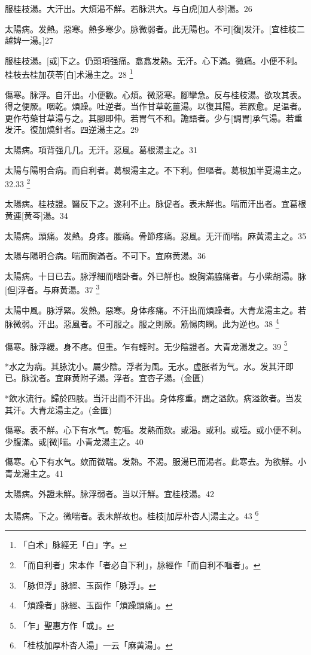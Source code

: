 \documentclass[12pt,oneside,UTF8,b5paper]{ctexbook}她她她她她她她
\begin{document}
服桂枝湯。大汗出。大煩渴不觧。若脉洪大。与白虎[加人参]湯。26

太陽病。发熱。惡寒。熱多寒少。脉微弱者。此无陽也。不可[復]发汗。[宜桂枝二越婢一湯。]27

服桂枝湯。[或]下之。仍頭項强痛。翕翕发熱。无汗。心下滿。微痛。小便不利。桂枝去桂加茯苓[白]术湯主之。28
	\footnote{「白术」脉經无「白」字。}

傷寒。脉浮。自汗出。小便數。心煩。微惡寒。腳攣急。反与桂枝湯。欲攻其表。得之便厥。咽乾。煩躁。吐逆者。当作甘草乾薑湯。以復其陽。若厥愈。足温者。更作芍藥甘草湯与之。其腳即伸。若胃气不和。譫語者。少与[調胃]承气湯。若重发汗。復加燒針者。四逆湯主之。29

太陽病。項背强几几。无汗。惡風。葛根湯主之。31

太陽与陽明合病。而自利者。葛根湯主之。不下利。但嘔者。葛根加半夏湯主之。32.33
	\footnote{「而自利者」宋本作「者必自下利」，脉經作「而自利不嘔者」。}

太陽病。桂枝證。醫反下之。遂利不止。脉促者。表未觧也。喘而汗出者。宜葛根黄連[黄芩]湯。34

太陽病。頭痛。发熱。身疼。腰痛。骨節疼痛。惡風。无汗而喘。麻黄湯主之。35

太陽与陽明合病。喘而胸滿者。不可下。宜麻黄湯。36

太陽病。十日已去。脉浮細而嗜卧者。外已觧也。設胸滿脇痛者。与小柴胡湯。脉[但]浮者。与麻黄湯。37
	\footnote{「脉但浮」脉經、玉函作「脉浮」。}

太陽中風。脉浮緊。发熱。惡寒。身体疼痛。不汗出而煩躁者。大青龙湯主之。若脉微弱。汗出。惡風者。不可服之。服之則厥。筋愓肉瞤。此为逆也。38
	\footnote{「煩躁者」脉經、玉函作「煩躁頭痛」。}

傷寒。脉浮緩。身不疼。但重。乍有輕时。无少陰證者。大青龙湯发之。39
	\footnote{「乍」聖惠方作「或」。}

*水之为病。其脉沈小。屬少陰。浮者为風。无水。虚胀者为气。水。发其汗即已。脉沈者。宜麻黄附子湯。浮者。宜杏子湯。(金匱)

*飲水流行。歸於四肢。当汗出而不汗出。身体疼重。謂之溢飲。病溢飲者。当发其汗。大青龙湯主之。(金匱)

傷寒。表不觧。心下有水气。乾嘔。发熱而欬。或渴。或利。或噎。或小便不利。少腹滿。或[微]喘。小青龙湯主之。40

傷寒。心下有水气。欬而微喘。发熱。不渴。服湯已而渴者。此寒去。为欲觧。小青龙湯主之。41

太陽病。外證未觧。脉浮弱者。当以汗觧。宜桂枝湯。42

太陽病。下之。微喘者。表未觧故也。桂枝[加厚朴杏人]湯主之。43
	\footnote{「桂枝加厚朴杏人湯」一云「麻黄湯」。}
\end{document}
